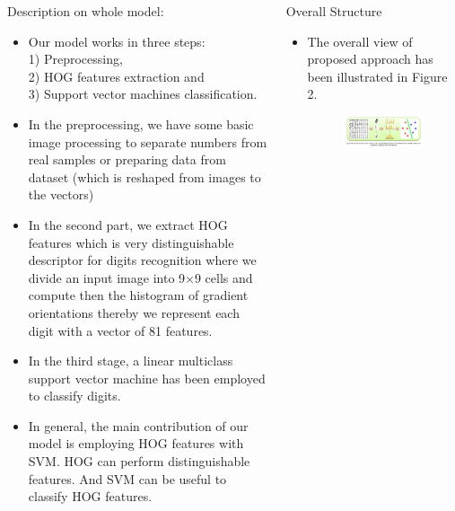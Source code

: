 \documentclass[8pt,final,hyperref={pdfpagelabels=false}]{beamer}
\theoremstyle{plain}
\begin{document}
\begin{frame}
\begin{columns}[t]
\begin{column}{.23\textwidth}
\begin{block}{Description on whole model:}
\begin{itemize}
            \item Our model works in three steps: \\ 1) Preprocessing, \\ 2) HOG features extraction and \\ 3) Support vector machines classification. \\ 
            \item In the preprocessing, we have some basic image processing to separate numbers from real samples or preparing data from dataset (which is reshaped from images to the vectors)
            
            \item In the second part, we extract HOG features which is very distinguishable descriptor for digits recognition where we divide an input image into 9×9 cells and compute then the histogram of gradient orientations thereby we represent each digit with a vector of 81 features. 
            
            \item In the third stage, a linear multiclass support vector machine has been employed to classify digits. 
             \item In general, the main contribution of our model is employing HOG features with SVM. HOG can perform distinguishable features. And SVM can be useful to classify HOG features.
        
        \end{itemize}
    \end{block}
    
\end{column} %

\begin{column}{.23\textwidth} %
    
        \begin{block}{Overall Structure}
        \begin{itemize}
        
            \item The overall view of proposed approach has been illustrated in Figure 2.
            \begin{figure}
                \includegraphics[width=.8\linewidth]{figures/HOG and SVM.png}
            \end{figure}
            

\end{itemize}
\end{block}
\end{column}
\end{columns}
\end{frame}
\end{document}
